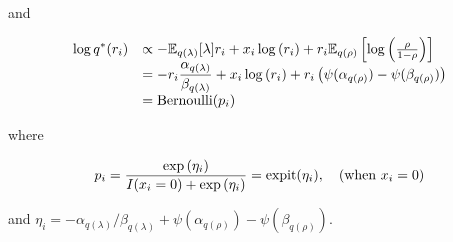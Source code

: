 \documentclass{article}[12pt]
\begin{document}
\noindent and

$$
\begin{array}{rl}
\ds \log{q^*(r_i)} &\propto -\bE_{q(\lambda)} [\lambda ] r_i + x_i \log{(r_i)} + r_i \bE_{q(\rho)} \left[\log{\left(\frac{\rho}{1 - \rho}\right)}\right]\\[0.5ex]
& \ds = -r_i \frac{\alpha_{q(\lambda)}}{\beta_{q(\lambda)}} + x_i \log{(r_i)} + r_i \left(\psi(\alpha_{q(\rho)}) - \psi(\beta_{q(\rho)})\right)\\ [0.5ex]%
& \ds = \text{Bernoulli}(p_i)
\end{array}
$$

\noindent where

$$
\begin{array}{rl}
\displaystyle p_i 
     = \frac{\exp{(\eta_i)}}{I(x_i = 0) + \exp{(\eta_i)}}  
     = \text{expit}(\eta_i), \quad \mbox{(when $x_i = 0$)} 
\end{array}
$$

\noindent and $\eta_i = - \alpha_{q(\lambda)}/\beta_{q(\lambda)} + \psi(\alpha_{q(\rho)}) - \psi(\beta_{q(\rho)})$.
%
%
%
%
%
%
%
%
%
\end{document}
